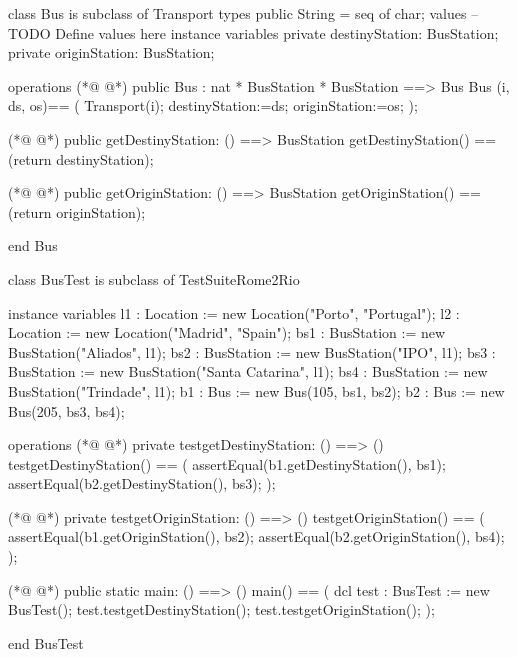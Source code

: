 \begin{vdmpp}[breaklines=true]
class Bus is subclass of Transport 
types
public String = seq of char;
values
-- TODO Define values here
instance variables
private destinyStation: BusStation;
private originStation: BusStation;

operations
(*@
\label{Bus:11}
@*)
public Bus : nat * BusStation * BusStation ==> Bus
Bus (i, ds, os)== (
 Transport(i);
 destinyStation:=ds;
 originStation:=os;
 );


(*@
\label{getDestinyStation:19}
@*)
public getDestinyStation: () ==> BusStation
 getDestinyStation() == (return destinyStation);
 
(*@
\label{getOriginStation:22}
@*)
public getOriginStation: () ==> BusStation
 getOriginStation() == (return originStation);
  
end Bus

class BusTest is subclass of TestSuiteRome2Rio

 instance variables
 l1 :  Location := new Location("Porto", "Portugal");
 l2 : Location := new Location("Madrid", "Spain");
 bs1 : BusStation := new BusStation("Aliados", l1);
 bs2 : BusStation := new BusStation("IPO", l1);
 bs3 : BusStation := new BusStation("Santa Catarina", l1);
 bs4 : BusStation := new BusStation("Trindade", l1);
 b1 : Bus := new Bus(105, bs1, bs2);
 b2 : Bus := new Bus(205, bs3, bs4);
 
 operations
(*@
\label{testgetDestinyStation:40}
@*)
  private testgetDestinyStation: () ==> ()
   testgetDestinyStation() == (
    assertEqual(b1.getDestinyStation(), bs1);
    assertEqual(b2.getDestinyStation(), bs3);
   );
   
(*@
\label{testgetOriginStation:46}
@*)
   private testgetOriginStation: () ==> ()
   testgetOriginStation() == (
    assertEqual(b1.getOriginStation(), bs2);
    assertEqual(b2.getOriginStation(), bs4);
   );
   
   
(*@
\label{main:53}
@*)
 public static main: () ==> ()
      main() ==
      (
       dcl test : BusTest := new BusTest();
       test.testgetDestinyStation();
       test.testgetOriginStation();
       );
       
end BusTest
\end{vdmpp}

